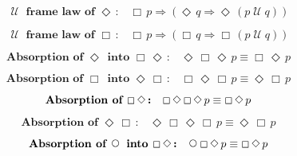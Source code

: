 \documentclass[12pt, fleqn, leqno]{article}
\newcommand{\impl}{\ensuremath{\Rightarrow}}        %
\newcommand{\Until}{\;\mathcal{U}\;}
\newcommand{\Next}{\;\,\text{\raisebox{3.5pt}{\circle{6}}}}
\newcommand{\Event}{\Diamond\,}
\newcommand{\Always}{\Box\,}
\newcommand{\spacer}{\vspace{-30pt}}
\begin{document}
\spacer

\begin{equation}\label{E:untilframelawEvent}
\textbf{$\Until$ frame law of $\Event$:}\quad \Always p \impl (\Event q \impl \Event (p \Until q))
\end{equation}

\spacer

\begin{equation}\label{E:untilframelawAlways}
\textbf{$\Until$ frame law of $\Always$:}\quad \Always p \impl (\Always q \impl \Always (p \Until q))
\end{equation}

\spacer

\begin{equation}\label{E:absEvent}
\textbf{Absorption of $\Event$ into $\Always\Event$:}\quad \Event\Always\Event p \equiv \Always\Event p
\end{equation}

\spacer

\begin{equation}\label{E:absAlways}
\textbf{Absorption of $\Always$ into $\Event\Always$:}\quad \Always\Event\Always p \equiv \Event\Always p
\end{equation}

\spacer

\begin{equation}\label{E:absAlwaysEvent}
\textbf{Absorption of $ \Always\Event$:}\quad \Always \Event\Always\Event p \equiv \Always\Event p
\end{equation}

\spacer

\begin{equation}\label{E:absEventAlways}
\textbf{Absorption of $\Event \Always$:}\quad \Event \Always \Event\Always p \equiv \Event\Always p
\end{equation}

\spacer

\begin{equation}\label{E:absNextAlwaysEvent}
\textbf{Absorption of $\Next$ into $\Always\Event$:}\quad \Next\Always\Event p \equiv \Always\Event p
\end{equation}
\end{document}

